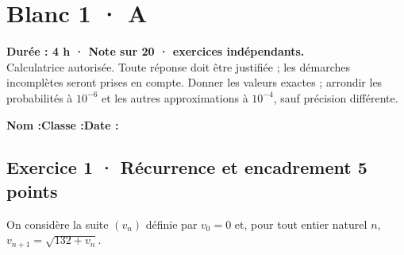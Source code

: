 \fi

\ifmxteacher

\mxnewpage{}\label{sujet:5-3}

\section*{Blanc 1 · A}


\textbf{Durée : 4 h · Note sur 20 ·  exercices indépendants.}\\Calculatrice autorisée. Toute réponse doit être justifiée ; les démarches incomplètes seront prises en compte. Donner les valeurs exactes ; arrondir les probabilités à $10^{-6}$ et les autres approximations à $10^{-4}$, sauf précision différente.

\smallskip\textbf{Nom :}\enspace\dotfill\quad\textbf{Classe :}\enspace\dotfill\quad\textbf{Date :}\enspace\dotfill

\subsection*{Exercice 1 · Récurrence et encadrement \hfill 5 points}On considère la suite $(v_n)$ définie par $v_0=0$ et, pour tout entier naturel $n$, $v_{n+1}=\sqrt{132+v_n}$.

